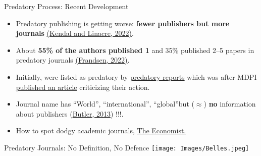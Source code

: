 \documentclass[11pt]{beamer}
\begin{document}

\begin{frame}{Predatory Process: Recent Development}
	\begin{itemize}
    \item Predatory publishing is getting worse: \textbf{fewer publishers but more journals} {\color{blue}\href{https://link.springer.com/article/10.1007/s12109-022-09888-z}{(Kendal and Linacre, 2022)}}.
    \smallskip\
    \item About \textbf{55\% of the authors published 1} and 35\% published 2–5 papers in predatory journals {\color{blue}\href{https://doi.org/10.1002/leap.1489}{(Frandsen, 2022)}}.
    \smallskip
    \item Initially, {} were listed as predatory by {\color{blue}\href{https://predatoryreports.org/home}{predatory reports}} which was {} after MDPI {\color{blue}\href{https://www.mdpi.com/about/announcements/5482}{published an article}} criticizing their action.
    \smallskip
    \item Journal name has \textquotedblleft World\textquotedblright, \textquotedblleft international\textquotedblright, \textquotedblleft global\textquotedblright but ($\approx$) \textbf{no} information about publishers ({\color{blue}\href{https://www.nature.com/articles/495433a}{Butler, 2013}}){\color{red} !!!}.
    \smallskip
    \item How to spot dodgy academic journals, {\color{blue}\href{https://www.economist.com/graphic-detail/2020/05/30/how-to-spot-dodgy-academic-journals}{The Economist.}}
\end{itemize}
\end{frame}

\begin{frame}{Predatory Journals: No Definition, No Defence}
    \centering\texttt{[image: Images/Belles.jpeg]}
\end{frame}
\end{document}
